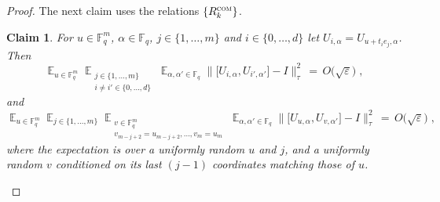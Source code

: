 \documentclass[11pt]{article}
\newtheorem{claim}[theorem]{Claim}
\theoremstyle{definition}
\newcommand{\Id}{\ensuremath{I}}
\DeclareMathOperator*{\Expectation}{\mathbb{E}}
\newcommand{\Es}[1]{\Expectation_{#1}}
\newcommand{\F}{\ensuremath{\mathbb{F}}}
\newcommand{\com}{\textsc{com}}
\newcommand{\eps}{\varepsilon}
\DeclareMathOperator{\tr}{tr}
\begin{document}
\begin{proof}

The next claim uses the relations $\{R^\com_k\}$.

\begin{claim}\label{claim:z2-stab-2b}
For $u\in \F_q^m$, $\alpha\in\F_q$, $j\in\{1,\ldots,m\}$ and $i\in \{0,\ldots,d\}$ let $U_{i,\alpha} = U_{u+t_ie_j,\alpha}$. Then 
\begin{equation}\label{eq:z2-stab-2b-0a}
\Es{u\in \F_q^m} \Es{\substack{j\in\{1,\ldots,m\}\\i\neq i' \in \{0,\ldots,d\}}}\Es{\alpha,\alpha'\in \F_q} \big\| \big[ U_{i,\alpha}, U_{i',\alpha'}\big]-\Id\big\|_\tau^2\,=\, O\big(\sqrt{\eps}\big)\;, 
\end{equation}
and
\begin{equation}\label{eq:z2-stab-2b-0b}
 \Es{u\in \F_q^m} \Es{j\in\{1,\ldots,m\}} \Es{\substack{v\in \F_q^m \\v_{m-j+2}=u_{m-j+2},\ldots,v_m=u_m}}\Es{\alpha,\alpha'\in \F_q} \big\| \big[ U_{u,\alpha}, U_{v,\alpha'}\big]-\Id\big\|_\tau^2\,=\, O\big(\sqrt{\eps}\big)\;,
\end{equation}
where the expectation is over a uniformly random $u$ and $j$, and a uniformly random $v$ conditioned on its last $(j-1)$ coordinates matching those of $u$. 
\end{claim}


\end{proof}
\end{document}
